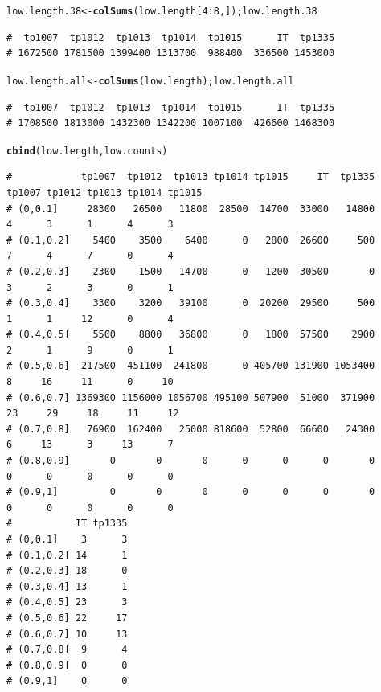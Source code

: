 \documentclass{article}\usepackage[]{graphicx}\usepackage[]{color}
\makeatletter
\newcommand{\hlnum}[1]{\textcolor[rgb]{0.686,0.059,0.569}{#1}}%
\newcommand{\hlopt}[1]{\textcolor[rgb]{0,0,0}{#1}}%
\newcommand{\hlstd}[1]{\textcolor[rgb]{0.345,0.345,0.345}{#1}}%
\newcommand{\hlkwb}[1]{\textcolor[rgb]{0.69,0.353,0.396}{#1}}%
\newcommand{\hlkwd}[1]{\textcolor[rgb]{0.737,0.353,0.396}{\textbf{#1}}}%
\newenvironment{kframe}{%
 \def\at@end@of@kframe{}%
 \ifinner\ifhmode%
  \def\at@end@of@kframe{\end{minipage}}%
  \begin{minipage}{\columnwidth}%
 \fi\fi%
 \def\FrameCommand##1{\hskip\@totalleftmargin \hskip-\fboxsep
 \colorbox{shadecolor}{##1}\hskip-\fboxsep
     \hskip-\linewidth \hskip-\@totalleftmargin \hskip\columnwidth}%
 \MakeFramed {\advance\hsize-\width
   \@totalleftmargin\z@ \linewidth\hsize
   \@setminipage}}%
 {\par\unskip\endMakeFramed%
 \at@end@of@kframe}
\newenvironment{knitrout}{}{} %
\makeatother
\begin{document}
\begin{knitrout}
\begin{kframe}
\begin{verbatim}
\end{verbatim}
\begin{alltt}
\hlstd{low.length.38} \hlkwb{<-} \hlkwd{colSums}\hlstd{(low.length[}\hlnum{4}\hlopt{:}\hlnum{8}\hlstd{,]) ; low.length.38}
\end{alltt}
\begin{verbatim}
#  tp1007  tp1012  tp1013  tp1014  tp1015      IT  tp1335 
# 1672500 1781500 1399400 1313700  988400  336500 1453000
\end{verbatim}
\begin{alltt}
\hlstd{low.length.all} \hlkwb{<-} \hlkwd{colSums}\hlstd{(low.length) ; low.length.all}
\end{alltt}
\begin{verbatim}
#  tp1007  tp1012  tp1013  tp1014  tp1015      IT  tp1335 
# 1708500 1813000 1432300 1342200 1007100  426600 1468300
\end{verbatim}
\begin{alltt}
\hlkwd{cbind}\hlstd{(low.length, low.counts)}
\end{alltt}
\begin{verbatim}
#            tp1007  tp1012  tp1013 tp1014 tp1015     IT  tp1335 tp1007 tp1012 tp1013 tp1014 tp1015
# (0,0.1]     28300   26500   11800  28500  14700  33000   14800      4      3      1      4      3
# (0.1,0.2]    5400    3500    6400      0   2800  26600     500      7      4      7      0      4
# (0.2,0.3]    2300    1500   14700      0   1200  30500       0      3      2      3      0      1
# (0.3,0.4]    3300    3200   39100      0  20200  29500     500      1      1     12      0      4
# (0.4,0.5]    5500    8800   36800      0   1800  57500    2900      2      1      9      0      1
# (0.5,0.6]  217500  451100  241800      0 405700 131900 1053400      8     16     11      0     10
# (0.6,0.7] 1369300 1156000 1056700 495100 507900  51000  371900     23     29     18     11     12
# (0.7,0.8]   76900  162400   25000 818600  52800  66600   24300      6     13      3     13      7
# (0.8,0.9]       0       0       0      0      0      0       0      0      0      0      0      0
# (0.9,1]         0       0       0      0      0      0       0      0      0      0      0      0
#           IT tp1335
# (0,0.1]    3      3
# (0.1,0.2] 14      1
# (0.2,0.3] 18      0
# (0.3,0.4] 13      1
# (0.4,0.5] 23      3
# (0.5,0.6] 22     17
# (0.6,0.7] 10     13
# (0.7,0.8]  9      4
# (0.8,0.9]  0      0
# (0.9,1]    0      0
\end{verbatim}
\end{kframe}
\end{knitrout}
\end{document}
